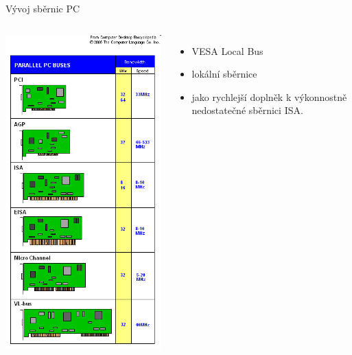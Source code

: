 \documentclass[aspectratio=43]{beamer}
\begin{document}
\begin{frame}{Vývoj sběrnic PC}
	
	\begin{columns}
		\includegraphics[width=0.85\linewidth]{extrahovane_obrazky/img_1_page6_0.png}
		\begin{itemize}
			\item VESA Local Bus
			\item lokální sběrnice
			\item jako rychlejší doplněk k výkonnostně nedostatečné sběrnici ISA.

\end{itemize}
\end{columns}
\end{frame}
\end{document}

